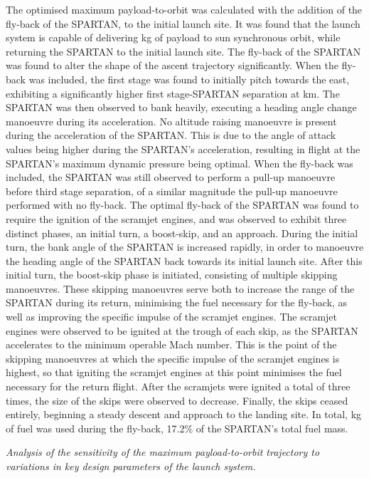 The optimised maximum payload-to-orbit was calculated with the addition of the fly-back of the SPARTAN, to the initial launch site. It was found that the launch system is capable of delivering \PayloadToOrbitStandard kg of payload to sun synchronous orbit, while returning the SPARTAN to the initial launch site. 
	The fly-back of the SPARTAN was found to alter the shape of the ascent trajectory significantly. When the fly-back was included, the first stage was found to initially pitch towards the east, exhibiting a significantly higher first stage-SPARTAN separation at \firstsecondSeparationAltStandard km. The SPARTAN was then observed to bank heavily, executing a heading angle change manoeuvre during its acceleration. No altitude raising manoeuvre is present during the acceleration of the SPARTAN. This is due to the angle of attack values being higher during the SPARTAN's acceleration, resulting in flight at the SPARTAN's maximum dynamic pressure being optimal. 
When the fly-back was included, the SPARTAN was still observed to perform a pull-up manoeuvre before third stage separation, of a similar magnitude the pull-up manoeuvre performed with no fly-back. 
The optimal fly-back of the SPARTAN was found to require the ignition of the scramjet engines, and was observed to exhibit three distinct phases, an initial turn, a boost-skip, and an approach. 
During the initial turn, the bank angle of the SPARTAN is increased rapidly, in order to manoeuvre the heading angle of the SPARTAN back towards its initial launch site. 
After this initial turn, the boost-skip phase is initiated, consisting of multiple skipping manoeuvres. These skipping manoeuvres serve both to increase the range of the SPARTAN during its return, minimising the fuel necessary for the fly-back, as well as improving the specific impulse of the scramjet engines.
 The scramjet engines were observed to be ignited at the trough of each skip, as the SPARTAN accelerates to the minimum operable Mach number. This is the point of the skipping manoeuvres at which the specific impulse of the scramjet engines is highest, so that igniting the scramjet engines at this point minimises the fuel necessary for the return flight. 
 After the scramjets were ignited a total of three times, the size of the skips were observed to decrease. Finally, the skips ceased entirely, beginning a steady descent and approach to the landing site. 
 In total, \returnFuelStandard kg of fuel was used during the fly-back, 17.2\% of the SPARTAN's total fuel mass.
	
	\emph{Analysis of the sensitivity of the maximum payload-to-orbit trajectory to variations in key design parameters of the launch system.}
	
